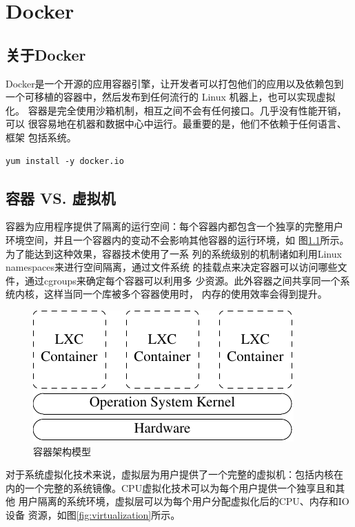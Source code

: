 \chapter{Docker}

\section{关于Docker}

Docker是一个开源的应用容器引擎，让开发者可以打包他们的应用以及依赖包到
一个可移植的容器中，然后发布到任何流行的 Linux 机器上，也可以实现虚拟化。
容器是完全使用沙箱机制，相互之间不会有任何接口。几乎没有性能开销，可以
很容易地在机器和数据中心中运行。最重要的是，他们不依赖于任何语言、框架
包括系统。

\begin{verbatim}
yum install -y docker.io
\end{verbatim}

\section{容器 VS. 虚拟机}

容器为应用程序提供了隔离的运行空间：每个容器内都包含一个独享的完整用户
环境空间，并且一个容器内的变动不会影响其他容器的运行环境，如
图\ref{fig:container}所示。为了能达到这种效果，容器技术使用了一系
列的系统级别的机制诸如利用Linux namespaces来进行空间隔离，通过文件系统
的挂载点来决定容器可以访问哪些文件，通过cgroups来确定每个容器可以利用多
少资源。此外容器之间共享同一个系统内核，这样当同一个库被多个容器使用时，
内存的使用效率会得到提升。

\begin{figure}[!htbp]
  \centering
  \includegraphics{graph/container01.pdf}
    \caption{容器架构模型}
  \label{fig:container}
\end{figure}

对于系统虚拟化技术来说，虚拟层为用户提供了一个完整的虚拟机：包括内核在
内的一个完整的系统镜像。CPU虚拟化技术可以为每个用户提供一个独享且和其他
用户隔离的系统环境，虚拟层可以为每个用户分配虚拟化后的CPU、内存和IO设备
资源，如图\ref{fig:virtualization}所示。

